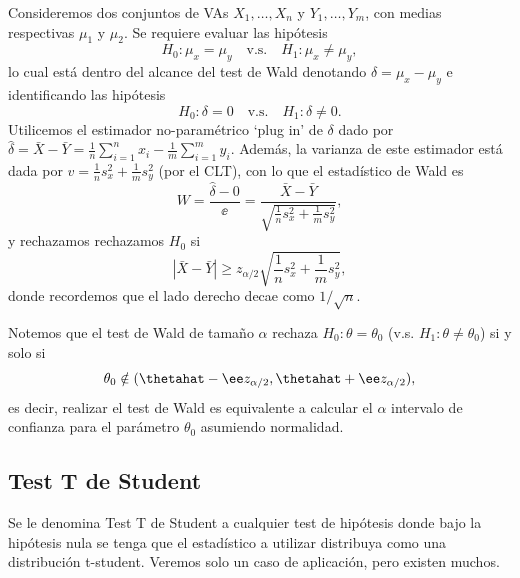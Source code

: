 \begin{example}
 Consideremos dos conjuntos de VAs $X_1,\ldots,X_n$ y $Y_1,\ldots,Y_m$, con medias respectivas $\mu_1$ y $\mu_2$. Se requiere evaluar las hipótesis
 	\begin{equation}
		H_0:\mu_x =\mu_y \quad \text{v.s.}\quad H_1:\mu_x \neq \mu_y,
	\end{equation}
	lo cual está dentro del alcance del test de Wald denotando $\delta = \mu_x - \mu_y$ e identificando las hipótesis
	 	\begin{equation}
		H_0:\delta =0 \quad \text{v.s.}\quad H_1:\delta \neq 0.
	\end{equation}
Utilicemos el estimador no-paramétrico `plug in' de $\delta$ dado por  $\hat{\delta} = \bar{X}-\bar{Y} = \frac{1}{n}\sum_{i=1}^n x_i - \frac{1}{m}\sum_{i=1}^m y_i$. Además, la varianza de este estimador está dada por $v = \frac{1}{n}s_x^2 + \frac{1}{m}s_y^2$ (por el CLT), con lo que el  estadístico de Wald es
\begin{equation}
	W = \frac{\hat{\delta}-0}{\ee} = \frac{\bar{X}-\bar{Y}}{\sqrt{\frac{1}{n}s_x^2 + \frac{1}{m}s_y^2}},
\end{equation}
y rechazamos rechazamos $H_0$ si
\begin{equation}
	|\bar{X}-\bar{Y}| \geq z_{\alpha/2} \sqrt{\frac{1}{n}s_x^2 + \frac{1}{m}s_y^2},
\end{equation}
donde recordemos que el lado derecho decae como $1/\sqrt{n}$.
\end{example}

\begin{remark}
Notemos que el test de Wald de tamaño $\alpha$ rechaza $H_0:\theta=\theta_0$ (v.s. $H_1:\theta\neq\theta_0$) si y solo si 
\begin{equation}
	\theta_0 \notin (\thetahat - \ee z_{\alpha/2},\thetahat + \ee z_{\alpha/2}),
\end{equation}
es decir, realizar el test de Wald es equivalente a calcular el $\alpha$ intervalo de confianza para el parámetro $\theta_0$ asumiendo normalidad.
\end{remark}

\subsection{Test T de Student}

Se le denomina Test T de Student a cualquier test de hipótesis donde bajo la hipótesis nula se tenga que el estadístico a utilizar distribuya como una distribución t-student. Veremos solo un caso de aplicación, pero existen muchos.

